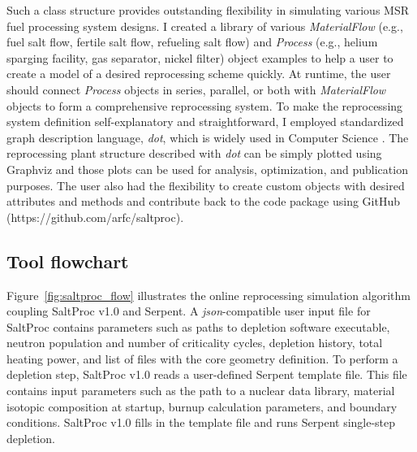 Such a class structure provides outstanding flexibility in simulating 
various \gls{MSR} fuel processing system designs. I created a library of 
various \textit{MaterialFlow} (e.g., fuel salt flow, fertile salt flow, 
refueling salt flow) and \textit{Process} (e.g., helium sparging facility, gas 
separator, nickel filter) object examples to help a user to create a model of 
a desired reprocessing scheme quickly. At runtime, the user
should connect \textit{Process} objects in series, parallel, or both with 
\textit{MaterialFlow} objects to form a comprehensive reprocessing system. To 
make the reprocessing system definition self-explanatory and straightforward, 
I employed standardized graph description language, \emph{dot}, which is 
widely used in Computer Science \cite{koutsofios_drawing_1996}. The 
reprocessing plant structure described with \emph{dot} can be simply plotted 
using Graphviz \cite{ellson_graphviz_2003} and those plots can be used for 
analysis, optimization, and publication purposes. The user also had the  
flexibility to create custom objects with desired attributes and methods and 
contribute back to the code package using GitHub  
(https://github.com/arfc/saltproc).	

\subsection{Tool flowchart}
Figure~\ref{fig:saltproc_flow} illustrates the online reprocessing simulation 
algorithm coupling SaltProc v1.0 and Serpent. A \emph{json}-compatible 
user input file for SaltProc contains parameters such as paths to depletion 
software executable, neutron population and number of criticality cycles, 
depletion history, total heating power, and list of files with the core 
geometry definition. To perform a depletion step, SaltProc v1.0 reads a 
user-defined Serpent template file. This file contains input parameters such 
as the path to a nuclear data library, material isotopic composition at 
startup, burnup calculation parameters, and boundary conditions. SaltProc v1.0 
fills in the template file and runs Serpent single-step depletion. 

